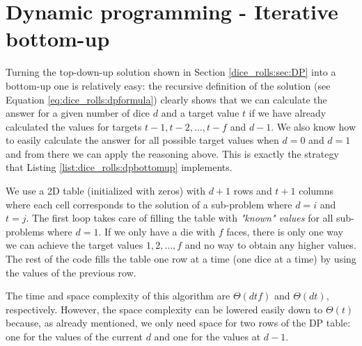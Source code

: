 \section{Dynamic programming - Iterative bottom-up}
\label{dice_rolls:sec:bottom}

Turning the top-down-up solution shown in Section \ref{dice_rolls:sec:DP} into a bottom-up one is relatively easy: the recursive
definition of the solution (see Equation \ref{eq:dice_rolls:dpformula})   clearly shows that we can
calculate the answer for a given number of dice $d$ and a target value $t$ if we have already
calculated the values for targets $t-1, t-2, \ldots, t-f$ and $d-1$. We also know how to easily
calculate the answer for all possible target values when $d=0$ and $d=1$ and from there we can apply
the reasoning above. 
This is exactly the strategy that Listing \ref{list:dice_rolls:dpbottomup} implements.



We use a 2D
table  (initialized with zeros) with $d+1$ rows and $t+1$ columns where each cell 
corresponds to the solution of a sub-problem where $d=i$ and $t=j$. The first loop takes care of
filling the table with \textit{"known" values} for all sub-problems where $d=1$. If we only have a die with
$f$ faces, there is only one way we can achieve the target values $1,2,\ldots, f$ and no way to
obtain any higher values. The rest of the code fills the table one row at a time (one dice at a
time) by using the values of the previous row. 

The time and space complexity of this algorithm are $\Theta(dtf)$ and $\Theta(dt)$, respectively. 
However, the space complexity can be lowered easily
down  to $\Theta(t)$ because, as already mentioned, we only need space for two rows of the DP table:
one for the values of the current $d$ and one for the values at $d-1$.
